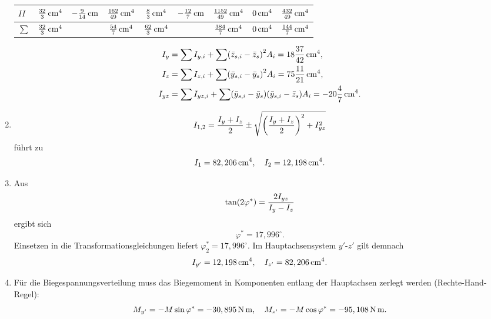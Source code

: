 \documentclass{exercise}
\begin{document}
\begin{enumerate}
\begin{center}
\begin{tabular}{lcccccccc}
                \(II\) & \(\frac{32}{3}\sis{\centi\meter\tothe{4}}\) & \(-\frac{9}{14}\sis{\centi\meter}\) & \(\frac{162}{49}\sis{\centi\meter\tothe{4}}\) & \(\frac{8}{3}\sis{\centi\meter\tothe{4}}\) & \(-\frac{12}{7}\sis{\centi\meter}\) & \(\frac{1152}{49}\sis{\centi\meter\tothe{4}}\) & \(0\sis{\centi\meter\tothe{4}}\) & \(\frac{432}{49}\sis{\centi\meter\tothe{4}}\)\\
                \midrule
                \(\sum\) & \(\frac{32}{3}\sis{\centi\meter\tothe{4}}\) & & \(\frac{54}{7}\sis{\centi\meter\tothe{4}}\) & \(\frac{62}{3}\sis{\centi\meter\tothe{4}}\) &  & \(\frac{384}{7}\sis{\centi\meter\tothe{4}}\) & \(0\sis{\centi\meter\tothe{4}}\) & \(\frac{144}{7}\sis{\centi\meter\tothe{4}}\)\\
                \bottomrule
            \end{tabular}
        \end{center}
        \begin{align*}
            I_y &= \sum I_{y, i} + \sum\parentheses*{\bar{z}_{s, i} - \bar{z}_s}^2 A_i = 18\frac{37}{42}\sis{\centi\meter\tothe{4}},\\
            I_z &= \sum I_{z, i} + \sum\parentheses*{\bar{y}_{s, i} - \bar{y}_s}^2 A_i = 75\frac{11}{21}\sis{\centi\meter\tothe{4}},\\
            I_{yz} &= \sum I_{yz, i} + \sum\parentheses*{\bar{y}_{s, i} - \bar{y}_s}\parentheses*{\bar{y}_{s, i} - \bar{z}_s} A_i = -20\frac{4}{7}\sis{\centi\meter\tothe{4}}.
        \end{align*}
        \item
        \[
            I_{1, 2} = \frac{I_y + I_z}{2} \pm \sqrt{\parentheses*{\frac{I_y + I_z}{2}}^2 + I_{yz}^2}
        \]
        führt zu
        \[
            I_1 = 82,206\sis{\centi\meter\tothe{4}}, \quad I_2 = 12,198\sis{\centi\meter\tothe{4}}.
        \]
        \item Aus
        \[
            \tan\parentheses*{2\varphi^*} = \frac{2I_{yz}}{I_y - I_z}
        \]
        ergibt sich
        \[
            \varphi^* = 17,996^\circ.
        \]
        Einsetzen in die Transformationsgleichungen liefert \(\varphi_2^* = 17,996^\circ\).
        Im Hauptachsensystem \(y'\)-\(z'\) gilt demnach
        \[
            I_{y'} = 12,198\sis{\centi\meter\tothe{4}}, \quad I_{z'} = 82,206\sis{\centi\meter\tothe{4}}.
        \]
        \item Für die Biegespannungsverteilung muss das Biegemoment in Komponenten entlang der Hauptachsen zerlegt werden (Rechte-Hand-Regel):
        \[
            M_{y'} = -M\sin\varphi^* = -30,895\sis{\newton\meter}, \quad M_{z'} = -M\cos\varphi^* = -95,108\sis{\newton\meter}.
\]
\end{enumerate}
\end{document}
